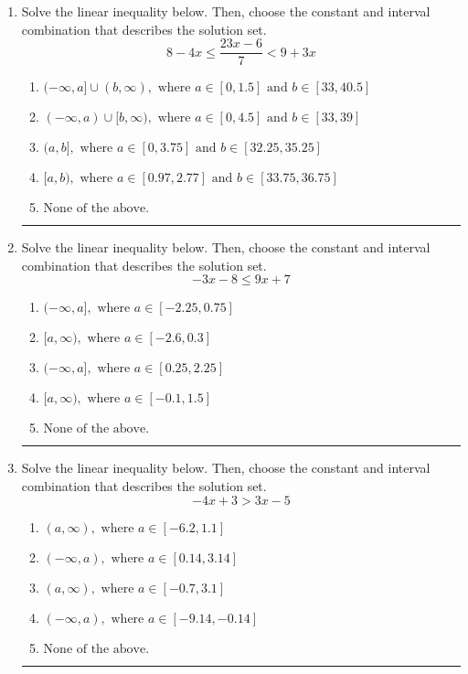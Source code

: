 \documentclass[14pt]{extbook}
\newcommand{\litem}[1]{\item#1\hspace*{-1cm}\rule{\textwidth}{0.4pt}}
\begin{document}
\begin{enumerate}
{\begin{enumerate}[label=\Alph*.]
\end{enumerate} }
\litem{
Solve the linear inequality below. Then, choose the constant and interval combination that describes the solution set.\[ 8 - 4 x \leq \frac{23 x - 6}{7} < 9 + 3 x \]\begin{enumerate}[label=\Alph*.]
\item \( (-\infty, a] \cup (b, \infty), \text{ where } a \in [0, 1.5] \text{ and } b \in [33, 40.5] \)
\item \( (-\infty, a) \cup [b, \infty), \text{ where } a \in [0, 4.5] \text{ and } b \in [33, 39] \)
\item \( (a, b], \text{ where } a \in [0, 3.75] \text{ and } b \in [32.25, 35.25] \)
\item \( [a, b), \text{ where } a \in [0.97, 2.77] \text{ and } b \in [33.75, 36.75] \)
\item \( \text{None of the above.} \)

\end{enumerate} }
\litem{
Solve the linear inequality below. Then, choose the constant and interval combination that describes the solution set.\[ -3x -8 \leq 9x + 7 \]\begin{enumerate}[label=\Alph*.]
\item \( (-\infty, a], \text{ where } a \in [-2.25, 0.75] \)
\item \( [a, \infty), \text{ where } a \in [-2.6, 0.3] \)
\item \( (-\infty, a], \text{ where } a \in [0.25, 2.25] \)
\item \( [a, \infty), \text{ where } a \in [-0.1, 1.5] \)
\item \( \text{None of the above}. \)

\end{enumerate} }
\litem{
Solve the linear inequality below. Then, choose the constant and interval combination that describes the solution set.\[ -4x + 3 > 3x -5 \]\begin{enumerate}[label=\Alph*.]
\item \( (a, \infty), \text{ where } a \in [-6.2, 1.1] \)
\item \( (-\infty, a), \text{ where } a \in [0.14, 3.14] \)
\item \( (a, \infty), \text{ where } a \in [-0.7, 3.1] \)
\item \( (-\infty, a), \text{ where } a \in [-9.14, -0.14] \)
\item \( \text{None of the above}. \)


\end{enumerate}}
\end{enumerate}
\end{document}
